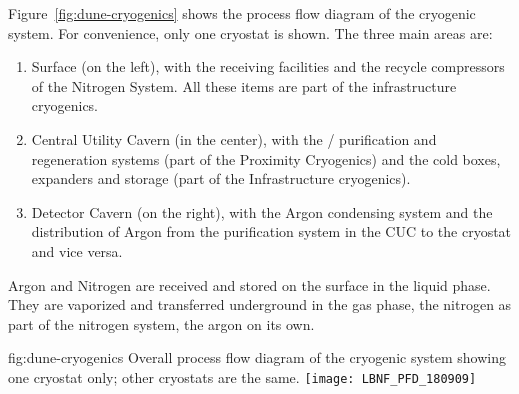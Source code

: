 Figure~\ref{fig:dune-cryogenics} shows the process flow diagram of the
 cryogenic system. For convenience, only one cryostat is shown. The three main areas are:
\begin{enumerate}
  \item Surface (on the left), with the receiving facilities and the
    recycle compressors of the Nitrogen System.  All these items are
    part of the infrastructure cryogenics.
  \item Central Utility Cavern (in the center), with the /
    purification and regeneration systems (part of the Proximity
    Cryogenics) and the cold boxes, expanders and  storage (part of
    the Infrastructure cryogenics).
\item Detector Cavern (on the right), with the Argon condensing system
  and the distribution of Argon from the purification system in the
  CUC to the cryostat and vice versa.
\end{enumerate}
Argon and Nitrogen are received and stored on the surface in the
liquid phase.  They are vaporized and transferred underground in the
gas phase, the nitrogen as part of the nitrogen system, the argon on
its own.
\begin{dunefigure}{fig:dune-cryogenics}
  {Overall process flow diagram of the cryogenic system showing one
    cryostat only; other cryostats are the same.}
  \texttt{[image: LBNF\_PFD\_180909]}
\end{dunefigure}


